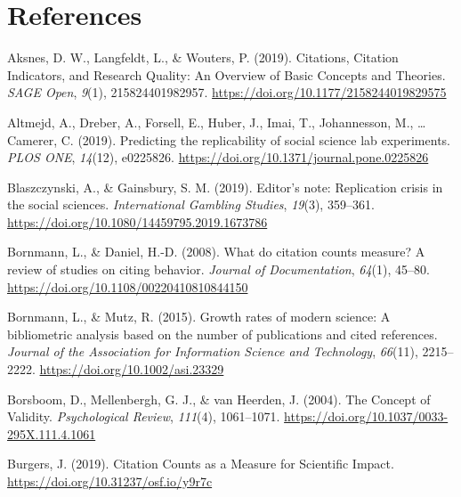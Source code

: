\documentclass[
  english,
  jou,floatsintext]{apa6}
\newlength{\cslhangindent}
\newlength{\cslentryspacingunit} %
\newenvironment{CSLReferences}[2] %
 {%
  \setlength{\parindent}{0pt}
  \ifodd #1
  \let\oldpar\par
  \def\par{\hangindent=\cslhangindent\oldpar}
  \fi
  \setlength{\parskip}{#2\cslentryspacingunit}
 }%
 {}
\begin{document}
\hypertarget{references}{%
\section*{References}\label{references}}

\hypertarget{refs}{}
\begin{CSLReferences}{1}{0}
\leavevmode{}%
Aksnes, D. W., Langfeldt, L., \& Wouters, P. (2019). Citations, {Citation Indicators}, and {Research Quality}: {An Overview} of {Basic Concepts} and {Theories}. \emph{SAGE Open}, \emph{9}(1), 215824401982957. \url{https://doi.org/10.1177/2158244019829575}

\leavevmode{}%
Altmejd, A., Dreber, A., Forsell, E., Huber, J., Imai, T., Johannesson, M., \ldots{} Camerer, C. (2019). Predicting the replicability of social science lab experiments. \emph{PLOS ONE}, \emph{14}(12), e0225826. \url{https://doi.org/10.1371/journal.pone.0225826}

\leavevmode{}%
Blaszczynski, A., \& Gainsbury, S. M. (2019). Editor's note: Replication crisis in the social sciences. \emph{International Gambling Studies}, \emph{19}(3), 359--361. \url{https://doi.org/10.1080/14459795.2019.1673786}

\leavevmode{}%
Bornmann, L., \& Daniel, H.-D. (2008). What do citation counts measure? {A} review of studies on citing behavior. \emph{Journal of Documentation}, \emph{64}(1), 45--80. \url{https://doi.org/10.1108/00220410810844150}

\leavevmode{}%
Bornmann, L., \& Mutz, R. (2015). Growth rates of modern science: {A} bibliometric analysis based on the number of publications and cited references. \emph{Journal of the Association for Information Science and Technology}, \emph{66}(11), 2215--2222. \url{https://doi.org/10.1002/asi.23329}

\leavevmode{}%
Borsboom, D., Mellenbergh, G. J., \& van Heerden, J. (2004). The {Concept} of {Validity}. \emph{Psychological Review}, \emph{111}(4), 1061--1071. \url{https://doi.org/10.1037/0033-295X.111.4.1061}

\leavevmode{}%
Burgers, J. (2019). Citation {Counts} as a {Measure} for {Scientific Impact}. \url{https://doi.org/10.31237/osf.io/y9r7c}


\end{CSLReferences}
\end{document}
